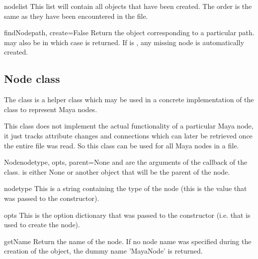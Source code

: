 \begin{memberdesc}{nodelist}
This list will contain all  objects that have been created.
The order is the same as they have been encountered in the file.
\end{memberdesc}

\begin{methoddesc}{findNode}{path, create=False}
Return the  object corresponding to a particular path.
 may also be  in which case  is returned.
If  is , any missing node is automatically created.
\end{methoddesc}

\subsection{Node class}

The  class is a helper class which may be used in a
concrete implementation of the  class to represent 
Maya nodes.

This class does not implement the actual functionality of a particular
Maya node, it just tracks attribute changes and connections which can
later be retrieved once the entire file was read. So this class can be
used for all Maya nodes in a file.

\begin{classdesc}{Node}{nodetype, opts, parent=None}
   and  are the arguments of the 
   callback of the  class.
   is either None or another  object that will 
  be the parent of the node.
\end{classdesc}

\begin{memberdesc}{nodetype}
This is a string containing the type of the node (this is the value
that was passed to the constructor).
\end{memberdesc}

\begin{memberdesc}{opts}
This is the option dictionary that was passed to the constructor
(i.e. that is used to create the node).
\end{memberdesc}

\begin{methoddesc}{getName}{}
Return the name of the node. If no node name was specified during the
creation of the object, the dummy name 'MayaNode' is returned.
\end{methoddesc}


